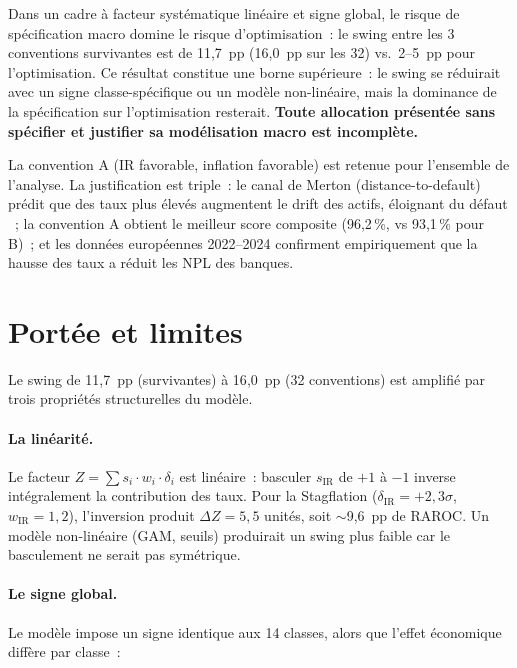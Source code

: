 \documentclass[10pt, a4paper, oneside]{report}
\theoremstyle{definition}
\begin{document}
\begin{tcolorbox}[colback=bleutitre!5, colframe=bleutitre, title=\textbf{Résultat central}]
Dans un cadre à facteur systématique linéaire et signe global, le risque de spécification macro domine le risque d'optimisation~: le swing entre les 3 conventions survivantes est de 11{,}7~pp (16{,}0~pp sur les 32) vs.\ 2--5~pp pour l'optimisation. Ce résultat constitue une borne supérieure~: le swing se réduirait avec un signe classe-spécifique ou un modèle non-linéaire, mais la dominance de la spécification sur l'optimisation resterait. \textbf{Toute allocation présentée sans spécifier et justifier sa modélisation macro est incomplète.}
\end{tcolorbox}

La convention A (IR favorable, inflation favorable) est retenue pour l'ensemble de l'analyse. La justification est triple~: le canal de Merton (distance-to-default) prédit que des taux plus élevés augmentent le drift des actifs, éloignant du défaut \citep{altavilla_boucinha_peydro2018}~; la convention A obtient le meilleur score composite (96{,}2\,\%, vs 93{,}1\,\% pour B)~; et les données européennes 2022--2024 confirment empiriquement que la hausse des taux a réduit les NPL des banques.


\section{Portée et limites}
\label{sec:ch5:portee}

Le swing de 11{,}7~pp (survivantes) à 16{,}0~pp (32 conventions) est amplifié par trois propriétés structurelles du modèle.

\paragraph{La linéarité.} Le facteur $Z = \sum s_i \cdot w_i \cdot \delta_i$ est linéaire~: basculer $s_{\text{IR}}$ de $+1$ à $-1$ inverse intégralement la contribution des taux. Pour la Stagflation ($\delta_{\text{IR}} = +2{,}3\sigma$, $w_{\text{IR}} = 1{,}2$), l'inversion produit $\Delta Z = 5{,}5$ unités, soit $\sim$9{,}6~pp de RAROC. Un modèle non-linéaire (GAM, seuils) produirait un swing plus faible car le basculement ne serait pas symétrique.

\paragraph{Le signe global.} Le modèle impose un signe identique aux 14 classes, alors que l'effet économique diffère par classe~:
\end{document}
